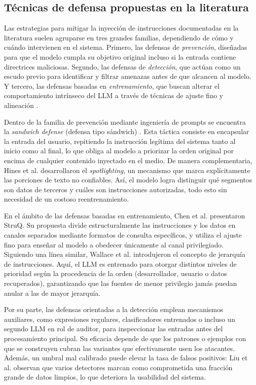 \documentclass[twocolumn]{article}
\begin{document}
\subsection{Técnicas de defensa propuestas en la literatura}

Las estrategias para mitigar la inyección de instrucciones documentadas en la literatura suelen agruparse en tres grandes familias, dependiendo de cómo y cuándo intervienen en el sistema. Primero, las defensas de \textit{prevención}, diseñadas para que el modelo cumpla su objetivo original incluso si la entrada contiene directrices maliciosas. Segundo, las defensas de \textit{detección}, que actúan como un escudo previo para identificar y filtrar amenazas antes de que alcancen al modelo. Y tercero, las defensas basadas en \textit{entrenamiento}, que buscan alterar el comportamiento intrínseco del LLM a través de técnicas de ajuste fino y alineación \cite{ref9}.

Dentro de la familia de prevención mediante ingeniería de prompts se encuentra la \textit{sandwich defense} (defensa tipo sándwich) \cite{refLP}. Esta táctica consiste en encapsular la entrada del usuario, repitiendo la instrucción legítima del sistema tanto al inicio como al final, lo que obliga al modelo a priorizar la orden original por encima de cualquier contenido inyectado en el medio. De manera complementaria, Hines et al. \cite{ref8} desarrollaron el \textit{spotlighting}, un mecanismo que marca explícitamente las porciones de texto no confiables. Así, el modelo logra distinguir qué segmentos son datos de terceros y cuáles son instrucciones autorizadas, todo esto sin necesidad de un costoso reentrenamiento.

En el ámbito de las defensas basadas en entrenamiento, Chen et al. \cite{ref6} presentaron StruQ. Su propuesta divide estructuralmente las instrucciones y los datos en canales separados mediante formatos de consulta específicos, y utiliza el ajuste fino para enseñar al modelo a obedecer únicamente al canal privilegiado. Siguiendo una línea similar, Wallace et al. \cite{ref7} introdujeron el concepto de jerarquía de instrucciones. Aquí, el LLM es entrenado para otorgar distintos niveles de prioridad según la procedencia de la orden (desarrollador, usuario o datos recuperados), garantizando que las fuentes de menor privilegio jamás puedan anular a las de mayor jerarquía.

Por su parte, las defensas orientadas a la detección emplean mecanismos auxiliares, como expresiones regulares, clasificadores entrenados o incluso un segundo LLM en rol de auditor, para inspeccionar las entradas antes del procesamiento principal. Su eficacia depende de que los patrones o ejemplos con que se construyen cubran las variantes que efectivamente usen los atacantes. Además, un umbral mal calibrado puede elevar la tasa de falsos positivos: Liu et al. \cite{ref5} observan que varios detectores marcan como comprometida una fracción grande de datos limpios, lo que deteriora la usabilidad del sistema.
\end{document}
